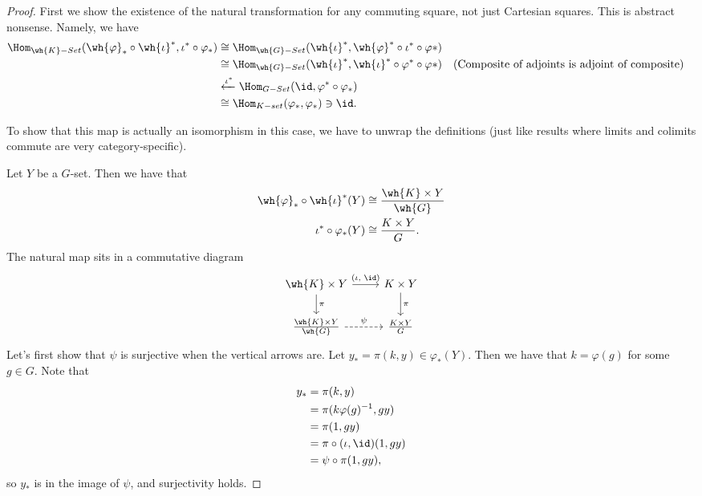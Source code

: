 \documentclass[12nt]{article}
\theoremstyle{plain}
\begin{document}
\begin{proof}
	First we show the existence of the natural transformation for any commuting square, not just Cartesian squares. This is abstract nonsense. Namely, we have
	\begin{align*}
		\Hom_{\wh{K}-Set}(\wh{\varphi}_* \circ \wh{\iota}^*, \iota^* \circ \varphi_*) &\cong \Hom_{\wh{G}-Set}(\wh{\iota}^*, \wh{\varphi}^* \circ \iota^* \circ \varphi*) \\
		&\cong \Hom_{\wh{G}-Set}(\wh{\iota}^*, \wh{\iota}^* \circ \varphi^* \circ \varphi*) && \text{(Composite of adjoints is adjoint of composite)}\\
		&\xleftarrow{\iota^*} \Hom_{G-Set}(\id, \varphi^* \circ \varphi_*) \\
		&\cong \Hom_{K-set}(\varphi_*, \varphi_*) \ni \id.
	\end{align*}

	To show that this map is actually an isomorphism in this case, we have to unwrap the definitions (just like results where limits and colimits commute are very category-specific).

	Let $Y$ be a $G$-set. Then we have that 
	\begin{align*}
		\wh{\varphi}_* \circ \wh{\iota}^*(Y) &\cong \frac{\wh{K} \times Y}{\wh{G}} \\
		\iota^* \circ \varphi_*(Y) &\cong \frac{K \times Y}{G}.
	\end{align*}
The natural map sits in a commutative diagram
\[
	\begin{tikzcd}
		\wh{K} \times Y \ar[r, "(\iota \text{, } \id)"] \ar[d, "\pi"] & K \times Y \ar[d, "\pi"] \\
		\frac{\wh{K} \times Y}{\wh{G}} \ar[r, dashed, "\psi"] & \frac{K \times Y}{G}
	\end{tikzcd}
\]
Let's first show that $\psi$ is surjective when the vertical arrows are. Let $y_* = \pi(k, y) \in \varphi_*(Y)$. Then we have that $k = \varphi(g)$ for some $g \in G$. Note that 
\begin{align*}
	y_* &= \pi(k, y) \\
	&= \pi(k\varphi(g)^{-1}, gy) \\
	&= \pi(1, gy) \\
	&= \pi \circ (\iota, \id)(1, gy) \\
	&= \psi \circ \pi(1, gy),
\end{align*}
so $y_*$ is in the image of $\psi$, and surjectivity holds. 


\end{proof}
\end{document}
